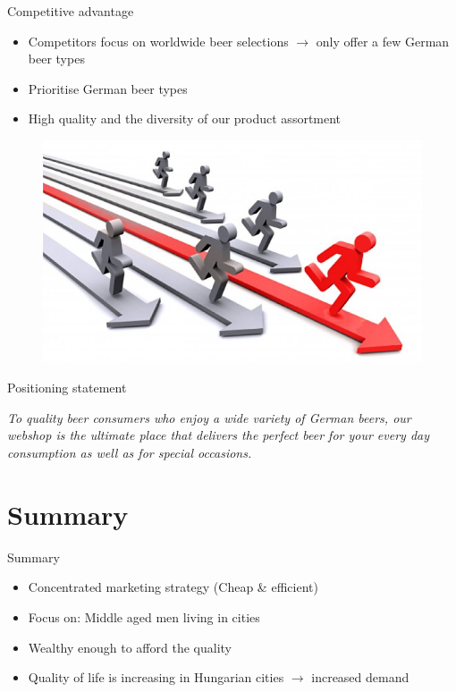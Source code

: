 \documentclass[aspectratio=43]{beamer}
\begin{document}
\begin{frame}{Competitive advantage}
\begin{itemize}
   \item Competitors focus on worldwide beer selections $\rightarrow$ only offer a few German beer types
   \item Prioritise German beer types
   \item High quality and the diversity of our product assortment
\end{itemize}
\begin{figure}[H]
  \centering
  \includegraphics[width=0.57\linewidth]{pics/bullshit3.jpg}
\end{figure}
\end{frame}

\begin{frame}{Positioning statement}

      \textit{To quality beer consumers who enjoy a wide variety of German beers, our webshop is the ultimate place that delivers the perfect beer for your every day consumption as well as for special occasions.}

\end{frame}






\section{Summary}

\begin{frame}{Summary}
\begin{itemize}
   \item Concentrated marketing strategy (Cheap \& efficient)
   \item Focus on: Middle aged men living in cities
   \item Wealthy enough to afford the quality
   \item Quality of life is increasing in Hungarian cities $\rightarrow$ increased demand
\end{itemize}
\end{frame}
\end{document}
